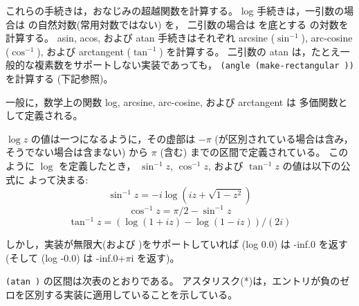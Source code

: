 \begin{entry}{%
}

これらの手続きは，おなじみの超越関数を計算する。
{\cf log} 手続きは，一引数の場合は  の自然対数(常用対数ではない) を，
二引数の場合は  を底とする  の対数を計算する。
{\cf asin}, {\cf acos}, および {\cf atan} 手続きはそれぞれ arcsine ($\sin^{-1}$),
arc-cosine ($\cos^{-1}$), および arctangent ($\tan^{-1}$) を計算する。
二引数の {\cf atan} は，たとえ一般的な複素数をサポートしない実装であっても，
{\tt (angle (make-rectangular  ))} を計算する (下記参照)。

一般に，数学上の関数 log, arcsine, arc-cosine, および arctangent は
多価関数として定義される。

$\log z$ の値は一つになるように，その虚部は $-\pi$ ({}が区別されている場合は含み，そうでない場合は含まない) から
$\pi$ (含む) までの区間で定義されている。
このように $\log$ を定義したとき，
$\sin^{-1} z$, $\cos^{-1} z$, および  $\tan^{-1} z$ の値は以下の公式に
よって決まる:
$$\sin^{-1} z = -i \log (i z + \sqrt{1 - z^2})$$
$$\cos^{-1} z = \pi / 2 - \sin^{-1} z$$
$$\tan^{-1} z = (\log (1 + i z) - \log (1 - i z)) / (2 i)$$

しかし，実装が無限大(および {})をサポートしていれば
{\cf (log 0.0)} は {\cf -inf.0} を返す
(そして {\cf (log -0.0)} は {\cf -inf.0+$\pi$i} を返す)。

\texttt{({\cf atan}  )} の区間は次表のとおりである。
アスタリスク(*)は，エントリが負のゼロを区別する実装に適用していることを示している。


\end{entry}
